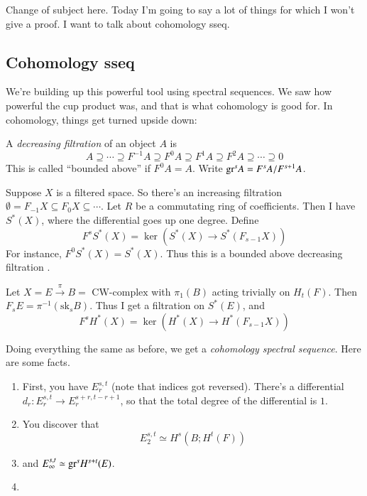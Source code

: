 Change of subject here.
Today I'm going to say a lot of things for which I won't give a proof.
I want to talk about cohomology sseq.
\subsection{Cohomology sseq}
We're building up this powerful tool using spectral sequences.
We saw how powerful the cup product was, and that is what cohomology is good for.
In cohomology, things get turned upside down:
\begin{definition}
    A \emph{decreasing filtration} of an object $A$ is
    $$A\supseteq\cdots\supseteq F^{-1} A\supseteq F^0 A \supseteq F^1 A\supseteq F^2 A\supseteq \cdots\supseteq 0$$
    This is called ``bounded above'' if $F^0 A = A$.
    Write $\mathrm{gr}^s A = F^sA/F^{s+1}A$.
\end{definition}
\begin{example}
    Suppose $X$ is a filtered space.
    So there's an increasing filtration $\emptyset=F_{-1}X\subseteq F_0X\subseteq\cdots$.
    Let $R$ be a commutating ring of coefficients.
    Then I have $S^\ast(X)$, where the differential goes up one degree.
    Define
    $$F^s S^\ast(X) = \ker(S^\ast(X)\to S^\ast(F_{s-1}X))$$
    For instance, $F^0 S^\ast(X) = S^\ast(X)$.
    Thus this is a bounded above decreasing filtration .
\end{example}
\begin{example}
    Let $X=E\xrightarrow{\pi}B = \text{ CW-complex}$ with $\pi_1(B)$ acting trivially on $H_t(F)$.
    Then $F_s E = \pi^{-1}(\mathrm{sk}_s B)$.
    Thus I get a filtration on $S^\ast(E)$, and
    $$
    F^s H^\ast(X) = \ker(H^\ast(X)\to H^\ast(F_{s-1}X))
    $$
\end{example}
Doing everything the same as before, we get a \emph{cohomology spectral sequence}.
Here are some facts.
\begin{enumerate}
    \item First, you have $E_r^{s,t}$ (note that indices got reversed).
	There's a differential $d_r:E^{s,t}_r \to E_r^{s+r,t-r+1}$, so that the total degree of the differential is $1$.
    \item You discover that
	$$
	E^{s,t}_2 \simeq H^s(B;H^t(F))
	$$
    \item and $E^{s,t}_\infty \simeq \mathrm{gr}^s H^{s+t}(E)$.
    \item 
\end{enumerate}
